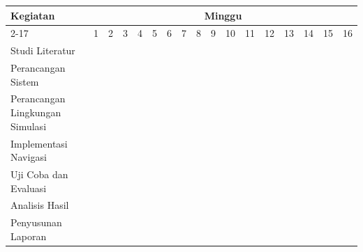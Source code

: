 \newcommand{\w}{}
\newcommand{\G}{\cellcolor{gray}}
\begin{table}[H]
  \label{tbl:timeline}
  \begin{tabular}{|p{3.5cm}|c|c|c|c|c|c|c|c|c|c|c|c|c|c|c|c|}

    \hline
    \multirow{2}{*}{Kegiatan} & \multicolumn{16}{|c|}{Minggu}                                                                       \\
    \cline{2-17}              &
    1                         & 2                             & 3  & 4  & 5  & 6  & 7  & 8  & 9  & 10 & 11 & 12 & 13 & 14 & 15 & 16 \\
    \hline

    Studi Literatur          &
    \G                        & \G                            & \w & \w & \w & \w & \w & \w & \w & \w & \w & \w & \w & \w & \w & \w \\
    \hline

    Perancangan Sistem           &
    \w                        & \w                            & \G & \G & \G & \G & \w & \w & \w & \w & \w & \w & \w & \w & \w & \w \\
    \hline

    Perancangan Lingkungan Simulasi              &
    \w                        & \w                            & \w & \w & \w & \G & \G & \G & \w & \w & \w & \w & \w & \w & \w & \w \\
    \hline

    Implementasi Navigasi       &
    \w                        & \w                            & \w & \w & \w & \w & \w & \G & \G & \G & \G & \w & \w & \w & \w & \w \\
    \hline
    Uji Coba dan Evaluasi       &
    \w                        & \w                            & \w & \w & \w & \w & \w & \w & \w & \w & \G & \G & \G & \w & \w & \w \\
    \hline
    Analisis Hasil       &
    \w                        & \w                            & \w & \w & \w & \w & \w & \w & \w & \w & \w & \w & \w & \G & \w & \w \\
    \hline

     Penyusunan Laporan      &
    \w                        & \w                            & \w & \w & \w & \w & \w & \w & \w & \w & \w & \w & \w & \w & \G & \G \\
    \hline
  \end{tabular}
\end{table}
